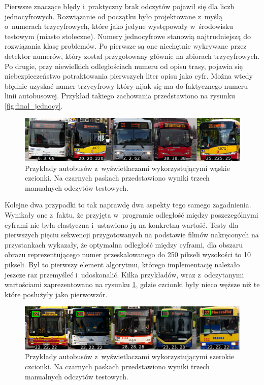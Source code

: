 Pierwsze znaczące błędy
i~praktyczny brak odczytów pojawił się dla liczb jednocyfrowych.
Rozwiązanie od początku było projektowane z~myślą o~numerach trzycyfrowych,
które jako jedyne występowały w~środowisku testowym (miasto stołeczne).
Numery jednocyfrowe stanowią najtrudniejszą do rozwiązania klasę
problemów. Po pierwsze są one niechętnie wykrywane przez detektor
numerów, który został przygotowany głównie na zbiorach trzycyfrowych.
Po drugie, przy niewielkich odległościach numeru od opisu trasy,
pojawia się niebezpieczeństwo potraktowania pierwszych liter opisu jako cyfr.
Można wtedy błędnie uzyskać numer trzycyfrowy który nijak się ma do
faktycznego numeru linii autobusowej. Przykład
takiego zachowania przedstawiono na rysunku \ref{fig:final_jednocy}.

\begin{figure}[h!]
	\centering
	\includegraphics[width=1\textwidth]{img/final/waskie}
	\caption{Przykłady autobusów z~wyświetlaczami wykorzystującymi 
		wąskie czcionki. Na czarnych paskach przedstawiono wyniki
		trzech manualnych odczytów testowych.}
	\label{fig:final_waskie}
\end{figure}

Kolejne dwa przypadki to tak naprawdę dwa aspekty tego samego zagadnienia.
Wynikały one z~faktu, że przyjęta w~programie odległość między poszczególnymi 
cyframi nie była elastyczna i~ustawiono ją na konkretną wartość.
Testy dla pierwszych pięciu
sekwencji przygotowanych na podstawie filmów nakręconych na przystankach
wykazały, że optymalna odległość między cyframi, dla obszaru obrazu
reprezentującego numer przeskalowanego do 250 pikseli wysokości to 10 pikseli.
Był to pierwszy element algorytmu, którego implementację należało jeszcze
raz przemyśleć i~udoskonalić.
Kilka przykładów, wraz z~odczytanymi wartościami 
zaprezentowano na rysunku \ref{fig:final_waskie}, 
gdzie czcionki były nieco węższe niż te które posłużyły jako pierwowzór.

\begin{figure}[h!]
	\centering
	\includegraphics[width=1\textwidth]{img/final/szerokie}
	\caption{Przykłady autobusów z~wyświetlaczami wykorzystującymi 
		szerokie czcionki. Na czarnych paskach przedstawiono wyniki
		trzech manualnych odczytów testowych.}
	\label{fig:final_szerokie}
\end{figure}

